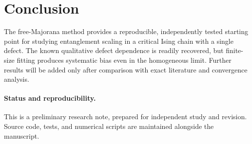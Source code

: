 \documentclass[11pt,a4paper]{article}
\begin{document}
\section{Conclusion}
The free-Majorana method provides a reproducible, independently
tested starting point for studying entanglement scaling in a
critical Ising chain with a single defect. The known qualitative
defect dependence is readily recovered, but finite-size fitting
produces systematic bias even in the homogeneous limit.
Further results will be added only after comparison with exact
literature and convergence analysis.

\paragraph{Status and reproducibility.}
This is a preliminary research note, prepared for independent
study and revision. Source code, tests, and numerical scripts
are maintained alongside the manuscript.



\end{document}
